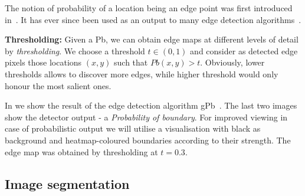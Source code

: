 The notion of probability of a location being an edge point was first introduced in~\cite{martin2004learning}. %
It has ever since been used as an output to many edge detection algorithms~\cite{Maire2008using,LimZD13,DollarICCV13edges,Isola2014crisp,Ganin2014n4fields,Hallman2014}.

\textbf{Thresholding:} Given a Pb, we can obtain edge maps at different levels of detail by {\it thresholding}. We choose a threshold $t\in(0,1)$ and consider as detected edge pixels those locations $(x,y)$ such that $Pb(x,y)>t$. Obviously, lower thresholds allows to discover more edges, while higher threshold would only honour the most salient ones.

In  we show the result of the edge detection algorithm gPb~\cite{Arbelaez11}. The last two images show the detector output - a {\it Probability of boundary}. For improved viewing in case of probabilistic output we will utilise a visualisation with black as background and heatmap-coloured boundaries according to their strength. The edge map  was obtained by thresholding at $t=0.3$.



\subsection{Image segmentation}
%


